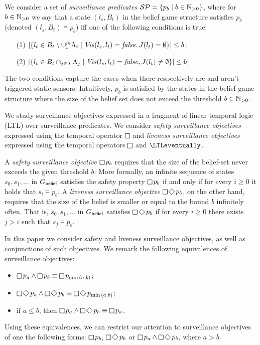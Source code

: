 We consider a set of \emph{surveillance predicates} $\mathcal{SP} = \{p_b \mid b \in \mathbb{N}_{>0}\}$, where for $b \in \mathbb{N}_{>0}$ we say that a state $(l_s,B_t)$ in the belief game structure satisfies $p_b$ (denoted $(l_s,B_t) \models p_b$) iff one of the following conditions is true:
\begin{itemize}
\item[(1)] $|\{l_t \in B_t \setminus \cup_i^m{\Lambda_i} \mid \mathit{Vis}(l_s,l_t)  = \mathit{false}, J(l_t) = \emptyset \}| \leq b$;
\item[(2)] $|\{l_t \in B_t \cap_{j\in J}{\Lambda_j} \mid \mathit{Vis}(l_s,l_t)  = \mathit{false}, J(l_t) \neq \emptyset \}| \leq b$;
\end{itemize}
The two conditions capture the cases when there respectively are and aren't triggered static sensors. Intuitively, $p_b$ is satisfied by the states in the belief game structure where the size of the belief set does not exceed the threshold $b \in \mathbb{N}_{>0}$.

We study surveillance objectives expressed in a fragment  of linear temporal logic (LTL) over surveillance predicates.  We consider  \emph{safety surveillance objectives} expressed using the temporal operator $\LTLglobally$ and \emph{liveness surveillance objectives} expressed using the temporal operators $\LTLglobally$ and $\LTLeventually$.

A \emph{safety surveillance objective} $\LTLglobally p_b$ requires that the size of the belief-set never exceeds the given threshold $b$. More formally, an infinite sequence of states $s_0,s_1,\ldots$ in $G_{\mathsf{belief}}$ satisfies the safety property $\LTLglobally p_b$ if and only if for every $i\geq 0$ it holds that $s_i \models p_b$.  A \emph{liveness surveillance objective} $\LTLglobally\LTLfinally p_b$, on the other hand, requires that 
the size of the belief is smaller or equal to the bound $b$  infinitely often. That is, $s_0,s_1,\ldots$ in $G_{\mathsf{belief}}$ satisfies $\LTLglobally\LTLfinally p_b$ if for every $i \geq 0$ there exists $j >i$ such that $s_j\models p_b$. 

In this paper we consider safety and liveness surveillance objectives, as well as conjunctions of such objectives. We remark the following equivalences of surveillance objectives:
\begin{itemize}
\item $\LTLglobally p_a \wedge \LTLglobally p_b \equiv \LTLglobally p_{\min{(a,b)}}$;
\item $\LTLglobally\LTLfinally p_a \wedge \LTLglobally\LTLfinally p_b \equiv \LTLglobally\LTLfinally p_{\min{(a,b)}}$;
\item if $a \leq b$, then $\LTLglobally p_a \wedge \LTLglobally\LTLfinally p_b \equiv\LTLglobally p_a$. 
\end{itemize}
Using these equivalences, we can restrict our attention to surveillance objectives of one the following  forms: $\LTLglobally p_b$, $\LTLglobally\LTLfinally p_b$ or $\LTLglobally p_a \wedge \LTLglobally\LTLfinally p_b$, where $a > b$. 
 



